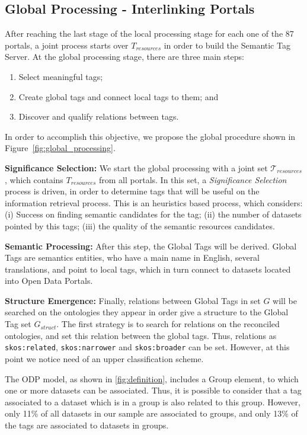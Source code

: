 \subsection{Global Processing - Interlinking Portals}
\label{sec:global_building}

After reaching the last stage of the local processing stage for each one of the 87 portals, a joint process starts over $T_{resources}$ in order to build the Semantic Tag Server.
At the global processing stage, there are three main steps:

\begin{enumerate}
	\item Select meaningful tags;
	\item Create global tags and connect local tags to them; and
	\item Discover and qualify relations between tags.
\end{enumerate}

In order to accomplish this objective, we propose the global procedure shown in Figure~\ref{fig:global_processing}.

\noindent \textbf{Significance Selection: } We start the global processing with a joint set $\mathcal{T}_{resources}$, which contains $T_{resources}$ from all portals. 
In this set, a \emph{Significance Selection} process is driven, in order to determine tags that will be useful on the information retrieval process.
This is an heuristics based process, which considers: (i) Success on finding semantic candidates for the tag; (ii) the number of datasets pointed by this tags; (iii) the quality of the semantic resources candidates.

\noindent \textbf{Semantic Processing:} After this step, the Global Tags will be derived.
Global Tags are semantics entities, who have a main name in English, several translations, and point to local tags, which in turn connect to datasets located into Open Data Portals.

\noindent \textbf{Structure Emergence:} Finally, relations between Global Tags in set $G$ will be searched on the ontologies they appear in order give a structure to the Global Tag set $G_{struct}$.
The first strategy is to search for relations on the reconciled ontologies, and set this relation between the global tags.
Thus, relations as \texttt{skos:related}, \texttt{skos:narrower} and \texttt{skos:broader} can be set.
However, at this point we notice need of an upper classification scheme.

The ODP model, as shown in \autoref{fig:definition}, includes a Group element, to which one or more datasets can be associated.
Thus, it is possible to consider that a tag associated to a dataset which is in a group is also related to this group.
However, only 11\% of all datasets in our sample are associated to groups, and only 13\% of the tags are associated to datasets in groups.

